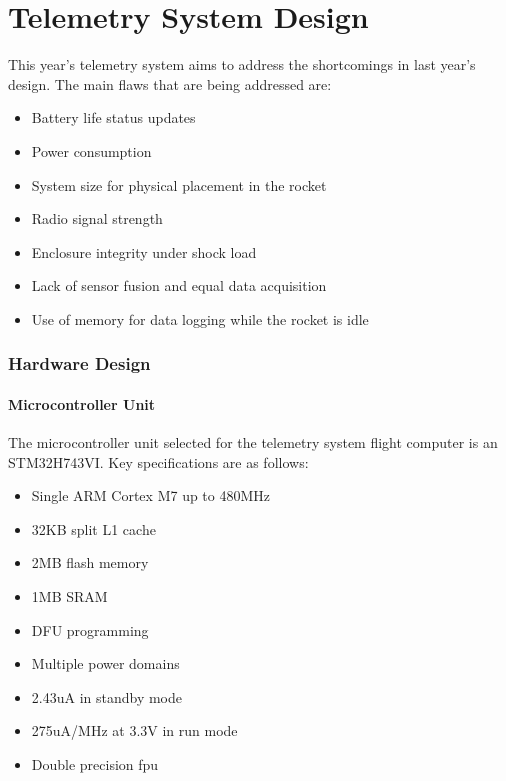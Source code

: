 \part{Telemetry System Design}

This year's telemetry system aims to address the shortcomings in last year's design. The main flaws that are being
addressed are:

\begin{itemize}
    \item Battery life status updates
    \item Power consumption
    \item System size for physical placement in the rocket
    \item Radio signal strength
    \item Enclosure integrity under shock load
    \item Lack of sensor fusion and equal data acquisition
    \item Use of memory for data logging while the rocket is idle
\end{itemize}

\section{Hardware Design}

\subsection{Microcontroller Unit}

The microcontroller unit selected for the telemetry system flight computer is an STM32H743VI. Key specifications are as
follows:

\begin{itemize}
    \item Single ARM Cortex M7 up to 480MHz \cite[1]{stm32h743vi}
    \item 32KB split L1 cache \cite[1]{stm32h743vi}
    \item 2MB flash memory \cite[1]{stm32h743vi}
    \item 1MB SRAM \cite[1]{stm32h743vi}
    \item DFU programming \cite[Sec. 3.4]{stm32h743vi}
    \item Multiple power domains \cite[1]{stm32h743vi}
    \item 2.43uA in standby mode \cite[1]{stm32h743vi}
    \item 275uA/MHz at 3.3V in run mode \cite[1]{stm32h743vi}
    \item Double precision \gls{fpu} \cite[1]{stm32h743vi}
\end{itemize}

